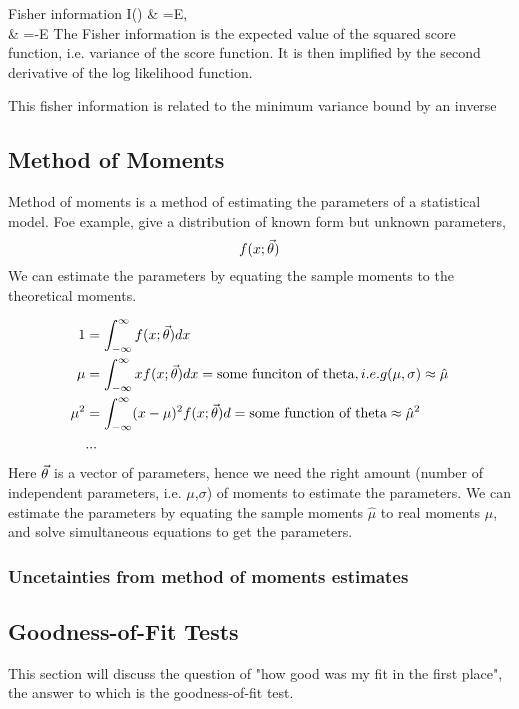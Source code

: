 \documentclass[12pt,a4paper]{article}
\begin{document}
\begin{definition}
    {Fisher information}
    {I(\theta) & =E, \\ & =-E}
    {The Fisher information is the expected value of the squared score function, i.e. variance of the score function. It is then implified by the second derivative of the log likelihood function.}
\end{definition}

This fisher information is related to the minimum variance bound by an inverse



\subsection{Method of Moments}
Method of moments is a method of estimating the parameters of a statistical model.
Foe example, give a distribution of known form but unknown parameters, $$f(x;\va{\theta})$$
We can estimate the parameters by equating the sample moments to the theoretical moments.

\begin{align}
    1 &= \int_{-\infty}^{\infty} f(x ; \va{\theta}) d x \\
    \mu &= \int_{-\infty}^{\infty} x f(x ; \va{\theta}) d x  = \text{some funciton of theta}, i.e. g(\mu,\sigma)\approx \hat{\mu} \\
    \mu^{2} &=\int_{-\infty}^{\infty}(x-\mu)^{2} f(x ; \va{\theta}) d = \text{some function of theta} \approx \hat{\mu}^{2} \\
    &...
\end{align}
Here $\va{\theta}$ is a vector of parameters, hence we need the right amount (number of independent parameters, i.e. $\mu$,$\sigma$) of moments to estimate the parameters.
We can estimate the parameters by equating the sample moments $\hat{\mu}$ to real moments $\mu$, and solve simultaneous equations to get the parameters.
\subsubsection{Uncetainties from method of moments estimates}

\subsection{Goodness-of-Fit Tests}
This section will discuss the question of "how good was my fit in the first place", the answer to which is the goodness-of-fit test.
\end{document}
